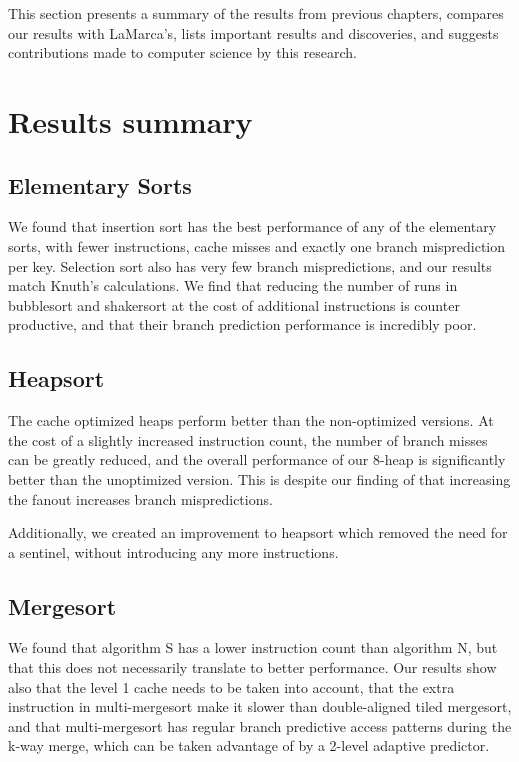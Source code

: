 \label{conclusions}
This section presents a summary of the results from previous chapters, compares
our results with LaMarca's, lists important results and discoveries, and
suggests contributions made to computer science by this research.

\section{Results summary}

\subsection{Elementary Sorts}

We found that insertion sort has the best performance of any of the elementary
sorts, with fewer instructions, cache misses and exactly one branch
misprediction per key. Selection sort also has very few branch mispredictions,
and our results match Knuth's calculations. We find that reducing the number of
runs in bubblesort and shakersort at the cost of additional instructions is
counter productive, and that their branch prediction performance is incredibly
poor.

\subsection{Heapsort}

The cache optimized heaps perform better than the non-optimized versions. At the
cost of a slightly increased instruction count, the number of branch misses can
be greatly reduced, and the overall performance of our 8-heap is significantly
better than the unoptimized version. This is despite our finding of that
increasing the fanout increases branch mispredictions.

Additionally, we created an improvement to heapsort which removed the need for a
sentinel, without introducing any more instructions.

\subsection{Mergesort}

We found that algorithm S has a lower instruction count than algorithm N, but
that this does not necessarily translate to better performance. Our results show
also that the level 1 cache needs to be taken into account, that the extra
instruction in multi-mergesort make it slower than double-aligned tiled
mergesort, and that multi-mergesort has regular branch predictive access
patterns during the k-way merge, which can be taken advantage of by a 2-level
adaptive predictor.


